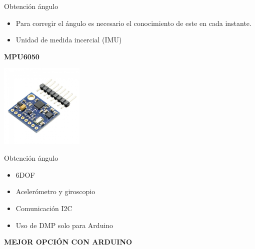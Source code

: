 \documentclass{beamer}
\begin{document}
\begin{frame}{Obtención ángulo}
\begin{block}{}
	\begin{itemize}
		\item Para corregir el ángulo es necesario el conocimiento de este en cada instante.\pause
		\item Unidad de medida incercial (IMU) \pause
	\end{itemize}
\end{block}
\begin{alertblock}{}
	\centering \textbf{MPU6050} \pause
\end{alertblock}
	\begin{center}
	\includegraphics [width =0.3\textwidth ]{imagenes/EstadoArte/IMU1}
\end{center}
\end{frame}

\begin{frame}{Obtención ángulo}
		\begin{block}{}
			\begin{itemize}
				\item 6DOF \pause
				\item Acelerómetro y giroscopio \pause
				\item Comunicación I2C \pause
				\item Uso de DMP solo para Arduino \pause
			\end{itemize}
		\end{block}
		\begin{alertblock}{}
			\centering \textbf{MEJOR OPCIÓN CON ARDUINO} 
		\end{alertblock}
\end{frame}
\end{document}
